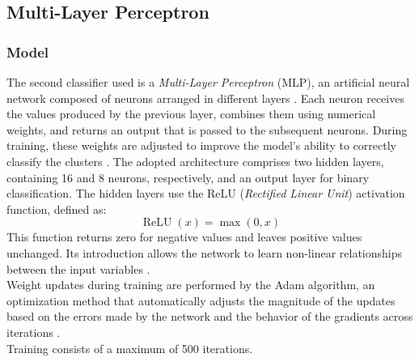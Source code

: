 \subsection{Multi-Layer Perceptron}
\label{subsec:mlp}
\subsubsection{Model}
The second classifier used is a \emph{Multi-Layer Perceptron} (MLP), an artificial neural network composed of neurons arranged in different layers \cite{goodfellow2016deeplearning}. Each neuron receives the values produced by the previous layer, combines them using numerical weights, and returns an output that is passed to the subsequent neurons. During training, these weights are adjusted to improve the model's ability to correctly classify the clusters \cite{rumelhart1986learning}.
The adopted architecture comprises two hidden layers, containing 16 and 8 neurons, respectively, and an output layer for binary classification. The hidden layers use the ReLU (\emph{Rectified Linear Unit}) activation function, defined as:
\[
\operatorname{ReLU}(x)=\max(0,x)
\]
This function returns zero for negative values and leaves positive values unchanged. Its introduction allows the network to learn non-linear relationships between the input variables \cite{glorot2011rectifier}.\\
Weight updates during training are performed by the Adam algorithm, an optimization method that automatically adjusts the magnitude of the updates based on the errors made by the network and the behavior of the gradients across iterations \cite{kingma2015adam}.\\ Training consists of a maximum of 500 iterations.
